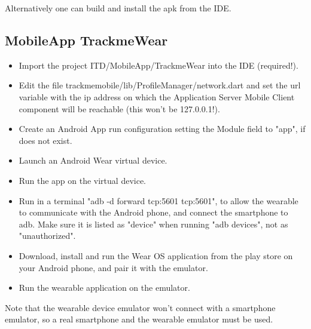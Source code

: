 \documentclass[../main.tex]{subfiles}
\begin{document}
Alternatively one can build and install the apk from the IDE.

\subsection{MobileApp TrackmeWear}

\begin{itemize}
	\item Import the project ITD/MobileApp/TrackmeWear into the IDE (required!).
	\item Edit the file trackmemobile/lib/ProfileManager/network.dart and set the \textunderscore url variable with the ip address on which the Application Server Mobile Client component will be reachable (this won't be 127.0.0.1!).
	\item Create an Android App run configuration setting the Module field to "app", if does not exist.
	\item Launch an Android Wear virtual device.
	\item Run the app on the virtual device.
	\item Run in a terminal "adb -d forward tcp:5601 tcp:5601", to allow the wearable to communicate with the Android phone, and connect the smartphone to adb. Make sure it is listed as "device" when running "adb devices", not as "unauthorized".
	\item Download, install and run the Wear OS application from the play store on your Android phone, and pair it with the emulator.
	\item Run the wearable application on the emulator.
\end{itemize}

Note that the wearable device emulator won't connect with a smartphone emulator, so a real smartphone and the wearable emulator must be used.
\end{document}
